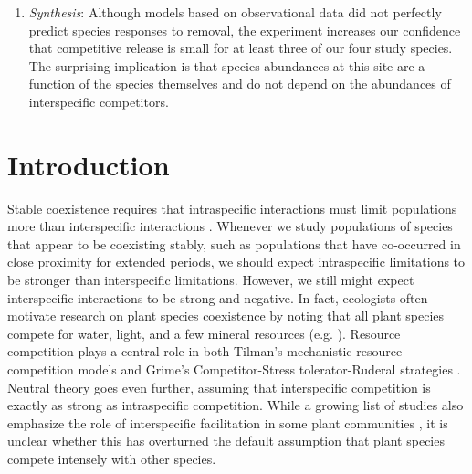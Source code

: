 \documentclass[11pt]{article}
\begin{document}
\begin{doublespacing}
\begin{enumerate}
\item \emph{Synthesis}: Although models based on observational data did not perfectly predict species responses to removal, the experiment increases our confidence that competitive release is small for at least three of our four study species. The surprising implication is that species abundances at this site are a function of the species themselves and do not depend on the abundances of interspecific competitors. 

\end{enumerate}


\section*{Introduction}

Stable coexistence requires that intraspecific interactions must limit populations more than interspecific interactions \citep{chesson_mechanisms_2000}.  Whenever we study populations of species that appear to be coexisting stably, such as populations that have co-occurred in close proximity for extended periods, we should expect intraspecific limitations to be stronger than interspecific limitations. However, we still might expect interspecific interactions to be strong and negative. In fact, ecologists often motivate research on plant species coexistence by noting that all plant species compete for water, light, and a few mineral resources (e.g. \citealt{silvertown_plant_2004}). Resource competition plays a central role in both Tilman's mechanistic resource competition models \citep{tilman_resource_1982} and Grime's Competitor-Stress tolerator-Ruderal strategies \citep{grime_plant_1979}. Neutral theory \citep{hubbell_unified_2001} goes even further, assuming that interspecific competition is exactly as strong as intraspecific competition. While a growing list of studies also emphasize the role of interspecific facilitation in some plant communities \citep{he_global_2013,brooker_facilitation_2008}, it is unclear whether this has overturned the default assumption that plant species compete intensely with other species.


\end{doublespacing}
\end{document}
